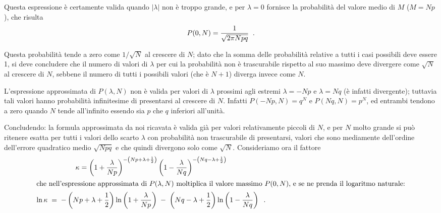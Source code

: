 Questa espressione \`e certamente valida quando $|\lambda|$
non \`e troppo grande, e per $\lambda=0$ fornisce la
probabilit\`a del valore medio di $M$ ($M=Np$), che risulta
\begin{equation*}
  P(0, N) = \frac{1}{\sqrt{2 \pi N p q}} \;\; .
\end{equation*}

Questa probabilit\`a tende a zero come $1/\sqrt{N}$ al
crescere di $N$; dato che la somma delle probabilit\`a
relative a tutti i casi possibili deve essere 1, si deve
concludere che il numero di valori di $\lambda$ per cui la
probabilit\`a non \`e trascurabile rispetto al suo massimo
deve divergere come $\sqrt{N}$ al crescere di $N$, sebbene
il numero di tutti i possibili valori (che \`e $N+1$)
diverga invece come $N$.

L'espressione approssimata di $P(\lambda, N)$ non \`e valida
per valori di $\lambda$ prossimi agli estremi $\lambda=-Np$
e $\lambda=Nq$ (\`e infatti divergente); tuttavia tali
valori hanno probabilit\`a infinitesime di presentarsi al
crescere di $N$.  Infatti $P(-Np, N) = q^N$ e $P(Nq, N) =
p^N$, ed entrambi tendono a zero quando $N$ tende
all'infinito essendo sia $p$ che $q$ inferiori all'unit\`a.

Concludendo: la formula approssimata da noi ricavata \`e
valida gi\`a per valori relativamente piccoli di $N$, e per
$N$ molto grande si pu\`o ritenere esatta per tutti i valori
dello scarto $\lambda$ con probabilit\`a non trascurabile di
presentarsi, valori che sono mediamente dell'ordine
dell'errore quadratico medio $\sqrt{Npq}$ e che quindi
divergono solo come $\sqrt{N}$.  Consideriamo ora il fattore
\begin{gather*}
  \kappa = \left( 1+ \frac{\lambda}{Np} \right) ^{- \left(
      Np +\lambda +\frac{1}{2} \right)} \left( 1
    -\frac{\lambda}{Nq} \right) ^{-
    \left( Nq -\lambda +\frac{1}{2} \right)} \\
  \intertext{che nell'espressione approssimata di
    $P(\lambda, N)$ moltiplica il valore massimo $P(0, N)$,
    e se ne prenda il logaritmo naturale:} \ln \kappa \; =
  \; - \left( Np +\lambda +\frac{1}{2} \right) \ln \left( 1
    +\frac{\lambda}{Np} \right) \; - \; \left( Nq -\lambda
    +\frac{1}{2} \right) \ln \left( 1 -\frac{\lambda}{Nq}
  \right) \;\; .
\end{gather*}

